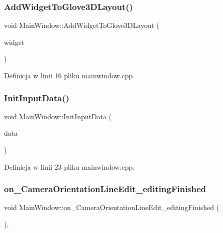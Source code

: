 \subsubsection{\texorpdfstring{Add\+Widget\+To\+Glove3\+D\+Layout()}{AddWidgetToGlove3DLayout()}}
{\footnotesize\ttfamily void Main\+Window\+::\+Add\+Widget\+To\+Glove3\+D\+Layout (\begin{DoxyParamCaption}\item[{Q\+Widget $\ast$}]{widget }\end{DoxyParamCaption})}



Definicja w linii 16 pliku mainwindow.\+cpp.

\mbox{\label{class_main_window_abd0772bfb398165834c0693627603b0f}} 
\subsubsection{\texorpdfstring{Init\+Input\+Data()}{InitInputData()}}
{\footnotesize\ttfamily void Main\+Window\+::\+Init\+Input\+Data (\begin{DoxyParamCaption}\item[{\hyperlink{class_input}{Input} $\ast$}]{data }\end{DoxyParamCaption})}



Definicja w linii 23 pliku mainwindow.\+cpp.

\mbox{\label{class_main_window_aeaf68d64561b179222fffc59bbd36e1e}} 
\subsubsection{\texorpdfstring{on\+\_\+\+Camera\+Orientation\+Line\+Edit\+\_\+editing\+Finished}{on\_CameraOrientationLineEdit\_editingFinished}}
{\footnotesize\ttfamily void Main\+Window\+::on\+\_\+\+Camera\+Orientation\+Line\+Edit\+\_\+editing\+Finished (\begin{DoxyParamCaption}{ }\end{DoxyParamCaption})\hspace{0.3cm}{\ttfamily [private]}, {\ttfamily [slot]}}




